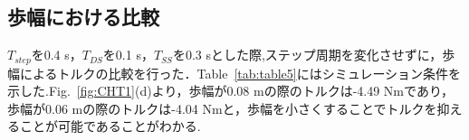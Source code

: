 \documentclass[twocolumn]{jsarticle}
\begin{document}
\subsection{歩幅における比較}
$T_{step}$を0.4 s，$T_{DS}$を0.1 s，$T_{SS}$を0.3 sとした際,ステップ周期を変化させずに，歩幅によるトルクの比較を行った．Table~\ref{tab:table5}にはシミュレーション条件を示した.Fig.~\ref{fig:CHT1}(d)より，歩幅が0.08 mの際のトルクは-4.49 Nmであり，歩幅が0.06 mの際のトルクは-4.04 Nmと，歩幅を小さくすることでトルクを抑えることが可能であることがわかる.
\end{document}
